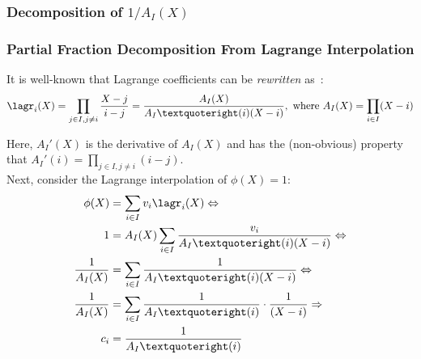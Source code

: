 \subsubsection{Decomposition of $1/A_I(X)$}
\begin{frame}
    \label{s:partial-fraction-decomposition}
    \frametitle{Partial Fraction Decomposition From Lagrange Interpolation}

    \small
    It is well-known that Lagrange coefficients can be \textit{rewritten} as~\cite{BT04,vG13ModernCh10}:
    \begin{align}
    \lagr_i(X)=\prod_{j\in I, j\ne i} \frac{X-j}{i - j}=\frac{A_I(X)}{A_I’(i) (X-i)},\ \text{where}\ A_I(X)=\prod_{i\in I} (X-i)
    \end{align}

    Here, $A_I'(X)$ is the derivative of $A_I(X)$ and has the (non-obvious) property that $A_I'(i)=\prod_{j\in I,j\ne i} (i-j)$.
    \\
    Next, consider the Lagrange interpolation of $\phi(X) = 1$:
    \begin{align}
    \phi(X) &= \sum_{i\in I} v_i \lagr_i(X)\Leftrightarrow\\
    1 &= A_I(X)\sum_{i\in I} \frac{v_i}{A_I’(i)(X-i)}\Leftrightarrow\\
    \frac{1}{A_I(X)} &= \sum_{i\in I} \frac{1}{A_I’(i)(X-i)}\Leftrightarrow\\
    \frac{1}{A_I(X)} &= \sum_{i\in I} \frac{1}{A_I’(i)}\cdot\frac{1}{(X-i)}\Rightarrow\\
    c_i &= \frac{1}{A_I’(i)}
    \end{align}
\end{frame}

